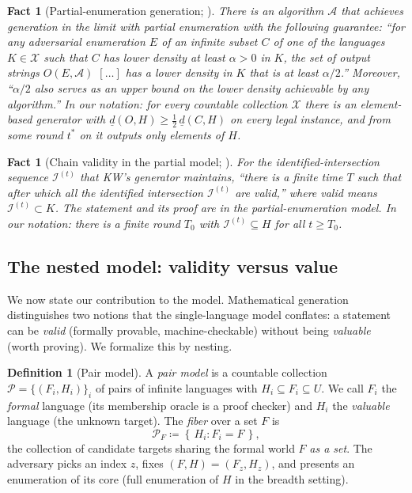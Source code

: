 \documentclass[11pt]{article}
\numberwithin{equation}{section}
\newcommand{\mc}[1]{\mathcal{#1}}
\newcommand{\defeq}{\coloneqq}
\newcommand{\gnd}{U}
\newcommand{\Amb}{F}
\newcommand{\Val}{H}
\newcommand{\Pairs}{\mc{P}}
\newcommand{\Out}{O}
\newcommand{\Core}{C}
\newcommand{\dlow}[2]{\underline{d}(#1,#2)}
\newcommand{\fiber}[1]{\Pairs_{#1}}
\newcommand{\setbuild}[2]{\left\{\,#1 : #2\,\right\}}
\theoremstyle{plain}
\newtheorem{fact}[theorem]{Fact}
\theoremstyle{definition}
\newtheorem{definition}[theorem]{Definition}
\theoremstyle{remark}
\begin{document}
\begin{fact}[Partial-enumeration generation; {\citep[Theorem~1.6 in arXiv version]{kleinberg2026partial}}]\label{fact:kw16}
There is an algorithm $\mathcal A$ that achieves generation in the limit with partial
enumeration with the following guarantee: ``for any adversarial enumeration $E$ of an infinite
subset $C$ of one of the languages $K \in \mathcal X$ such that $C$ has lower density at least
$\alpha > 0$ in $K$, the set of output strings $O(E, \mathcal A)$ $[\dots]$ has a lower
density in $K$ that is at least $\alpha/2$.'' Moreover, ``$\alpha/2$ also serves as an upper
bound on the lower density achievable by any algorithm.'' In our notation: for every countable
collection $\mathcal X$ there is an element-based generator with $\dlow{\Out}{\Val} \ge
\tfrac12\,\dlow{\Core}{\Val}$ on every legal instance, and from some round $t^*$ on it outputs
only elements of $\Val$.
\end{fact}

\begin{fact}[Chain validity in the partial model; {\citep[Lemma~2.5(1) in arXiv version]{kleinberg2026partial}}]\label{fact:kw25}
For the identified-intersection sequence $\mathcal I^{(t)}$ that KW's generator maintains,
``there is a finite time $T$ such that after which all the identified intersection $\mathcal
I^{(t)}$ are valid,'' where valid means $\mathcal I^{(t)} \subset K$. The statement and its
proof are in the partial-enumeration model. In our notation: there is a finite round $T_0$
with $\mathcal I^{(t)} \subseteq \Val$ for all $t \ge T_0$.
\end{fact}

\subsection{The nested model: validity versus value}
\label{sec:prelim-nested}

We now state our contribution to the model. Mathematical generation distinguishes two notions
that the single-language model conflates: a statement can be \emph{valid} (formally provable,
machine-checkable) without being \emph{valuable} (worth proving). We formalize this by
nesting.

\begin{definition}[Pair model]\label{def:pairmodel}
A \emph{pair model} is a countable collection $\Pairs = \{(\Amb_i, \Val_i)\}_i$ of pairs of
infinite languages with $\Val_i \subseteq \Amb_i \subseteq \gnd$. We call $\Amb_i$ the
\emph{formal} language (its membership oracle is a proof checker) and $\Val_i$ the
\emph{valuable} language (the unknown target). The \emph{fiber} over a set $F$ is
\begin{equation}\label{eq:fiber}
  \fiber{F} \defeq \setbuild{\Val_i}{\Amb_i = F},
\end{equation}
the collection of candidate targets sharing the formal world $F$ \emph{as a set}. The
adversary picks an index $z$, fixes $(\Amb,\Val) = (\Amb_z, \Val_z)$, and presents an
enumeration of its core (full enumeration of $\Val$ in the breadth setting).
\end{definition}
\end{document}
